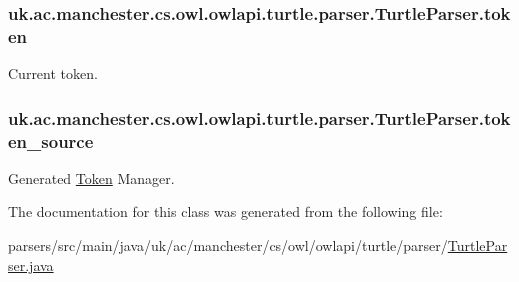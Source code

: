 \hypertarget{classuk_1_1ac_1_1manchester_1_1cs_1_1owl_1_1owlapi_1_1turtle_1_1parser_1_1_turtle_parser_a0d524d582590becd8514824f25cbd2c7}{
\subsubsection[{token}]{ uk.\-ac.\-manchester.\-cs.\-owl.\-owlapi.\-turtle.\-parser.\-Turtle\-Parser.\-token}}\label{classuk_1_1ac_1_1manchester_1_1cs_1_1owl_1_1owlapi_1_1turtle_1_1parser_1_1_turtle_parser_a0d524d582590becd8514824f25cbd2c7}
Current token. \hypertarget{classuk_1_1ac_1_1manchester_1_1cs_1_1owl_1_1owlapi_1_1turtle_1_1parser_1_1_turtle_parser_a7ea2c85336529462b02c99210d094ecb}{
\subsubsection[{token\-\_\-source}]{ uk.\-ac.\-manchester.\-cs.\-owl.\-owlapi.\-turtle.\-parser.\-Turtle\-Parser.\-token\-\_\-source}}\label{classuk_1_1ac_1_1manchester_1_1cs_1_1owl_1_1owlapi_1_1turtle_1_1parser_1_1_turtle_parser_a7ea2c85336529462b02c99210d094ecb}
Generated \hyperlink{classuk_1_1ac_1_1manchester_1_1cs_1_1owl_1_1owlapi_1_1turtle_1_1parser_1_1_token}{Token} Manager. 

The documentation for this class was generated from the following file\-:\begin{DoxyCompactItemize}
\item 
parsers/src/main/java/uk/ac/manchester/cs/owl/owlapi/turtle/parser/\hyperlink{_turtle_parser_8java}{Turtle\-Parser.\-java}\end{DoxyCompactItemize}
